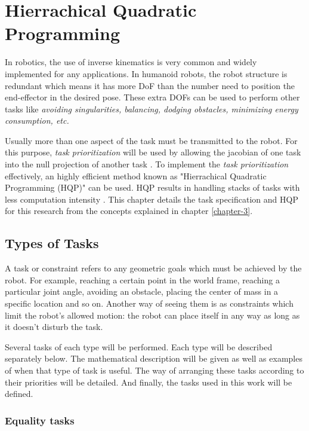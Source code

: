 \chapter{Hierrachical Quadratic Programming}
\label{chapter-4}

In robotics, the use of inverse kinematics is very common and widely implemented for any applications. In humanoid robots, the robot structure
is redundant which means it has more DoF than the number need to position the end-effector in the desired pose. These extra DOFs can be used to
perform other tasks like \textit{avoiding singularities, balancing, dodging obstacles, minimizing energy consumption, etc.} 

Usually more than one aspect of the task must be transmitted to the robot. For this purpose, \textit{task prioritization} will be used by allowing the jacobian of one task 
into the null projection of another task \cite{khalil2004modeling}. To implement the \textit{task prioritization} effectively, an highly efficient method known as 
"Hierrachical Quadratic Programming (HQP)" can be used. HQP results in handling stacks of tasks with less computation intensity \cite{escande2014hierarchical} . This chapter details the task specification and HQP for this
research from the concepts explained in chapter \ref{chapter-3}.

\section{Types of Tasks}

A task or constraint refers to any geometric goals which must be achieved by the robot. For example, reaching a certain point in the world frame, reaching a 
particular joint angle, avoiding an obstacle, placing the center of mass in a specific location and so on. Another way of seeing them is as constraints 
which limit the robot’s allowed motion: the robot can place itself in any way as long as it doesn’t disturb the task.

Several tasks of each type will be performed. Each type will be described separately below. The mathematical description will be given as well as 
examples of when that type of task is useful. The way of arranging these tasks according to their priorities will be detailed. And finally, the tasks 
used in this work will be defined.

\subsection{Equality tasks}

